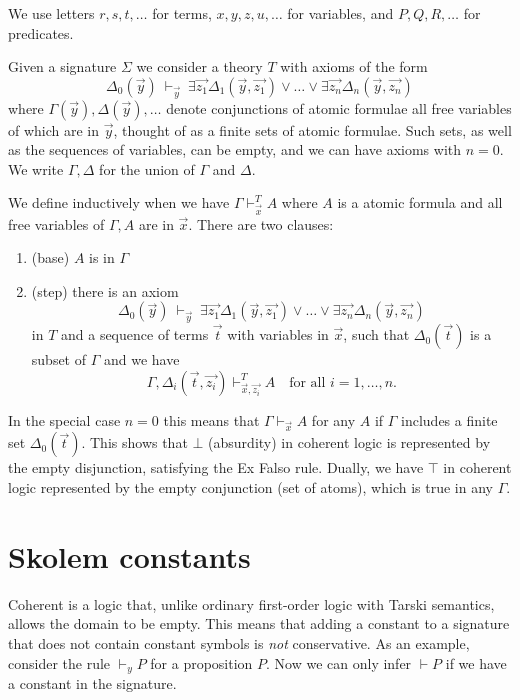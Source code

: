 \documentclass[10pt,a4paper]{article}
\begin{document}
We use letters $r,s,t,\dots$ for terms, $x,y,z,u,\dots$ for variables,
and $P,Q,R,\ldots$ for predicates.

\medskip

Given a signature $\Sigma$ we consider a theory $T$ with axioms of the form
$$
\Delta_0(\vec{y})~\vdash_{\vec{y}}~
\exists \vec{z_1}\Delta_1(\vec{y},\vec{z_1})\vee\dots\vee\exists \vec{z_n}\Delta_n(\vec{y},\vec{z_n})
$$
where $\Gamma(\vec{y}), \Delta(\vec{y}),\dots$ denote conjunctions of atomic formulae
all free variables of which are in $\vec{y}$, thought of as a finite sets of atomic formulae.
Such sets, as well as the sequences of variables, can be empty, 
and we can have axioms with $n=0$. 
We write $\Gamma,\Delta$ for the union of $\Gamma$ and $\Delta$.

 We define inductively when we have $\Gamma\vdash_{\vec{x}}^T A$ where $A$ is a atomic formula
and all free variables of $\Gamma,A$ are in $\vec{x}$. There are two clauses:

\begin{enumerate}
\item (base) $A$ is in $\Gamma$ 

\item (step) there is an axiom 
$$
\Delta_0(\vec{y})~\vdash_{\vec{y}}~
\exists \vec{z_1}\Delta_1(\vec{y},\vec{z_1})\vee\dots\vee\exists \vec{z_n}\Delta_n(\vec{y},\vec{z_n})
$$
in $T$ and a sequence of terms $\vec{t}$ with variables in $\vec{x}$,
such that $\Delta_0(\vec{t})$ is a subset of $\Gamma$ and
we have 
$$
\Gamma,\Delta_i(\vec{t},\vec{z_i})\vdash^T_{\vec{x},\vec{z_i}} A
\quad \text{for all $i = 1,\dots,n$.}
$$
\end{enumerate}

In the special case $n=0$ this means that $\Gamma\vdash_{\vec{x}} A$ for any $A$ if $\Gamma$
includes a finite set $\Delta_0(\vec{t})$. This shows that $\bot$ (absurdity) in coherent logic
is represented by the empty disjunction, satisfying the Ex Falso rule. Dually, we have $\top$
in coherent logic represented by  the empty conjunction (set of atoms), 
which is true in any $\Gamma$.

\section{Skolem constants}\label{sec:skolemconstant}

Coherent is a logic that, unlike ordinary first-order logic with Tarski semantics,
allows the domain to be empty. This means that adding a constant to a signature
that does not contain constant symbols is \emph{not} conservative.
As an example, consider the rule $\vdash_{y} P$ for a proposition $P$.
Now we can only infer $\vdash P$ if we have a constant in the signature.
\end{document}
